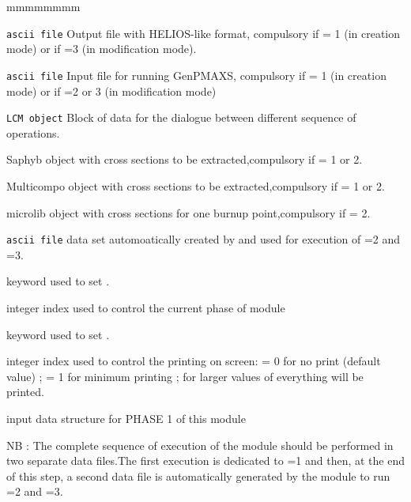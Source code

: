 \begin{ListeDeDescription}{mmmmmmmm}
\item[\dusa{HEL}] \texttt{ascii file} Output file with HELIOS-like format, compulsory if  = 1 (in creation mode) or if =3 (in modification mode).

\item[\dusa{GEN}] \texttt{ascii file} Input file for running GenPMAXS,  compulsory if  = 1 (in creation mode) or if =2 or 3 (in modification mode)

\item[\dusa{INF}]\texttt{LCM object} Block of data for the dialogue between different sequence of operations.

\item[\dusa{SAP}] Saphyb object with cross sections to be extracted,compulsory if  = 1 or 2.

\item[\dusa{MCO}] Multicompo object with cross sections to be extracted,compulsory if  = 1 or 2.

\item[\dusa{MIC}] microlib object with cross sections for one burnup point,compulsory if  = 2.

\item[\dusa{PROC}] \texttt{ascii file} data set automoatically created by  and used for execution of =2  and =3.

\item[\moc{PHASE}] keyword used to set .

\item[\dusa{iph}]integer index used to control the current phase of  module

\item[\moc{EDIT}] keyword used to set .

\item[\dusa{iprint}] integer index used to control the printing on screen:
 = 0 for no print (default value) ; = 1 for minimum printing ; for larger values of
 everything will be printed.

\item[\moc{(\textbf{descphase1})}] input data structure for PHASE 1 of this module
\end{ListeDeDescription}

NB : The complete sequence of execution of the  module should be performed in two separate data files.The first execution is dedicated to =1 and then, 
at the end of this step, a second data file is automatically generated by the module to run =2 and =3.

